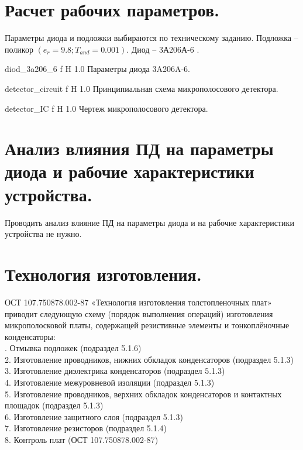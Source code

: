 \documentclass{bmstu}
\begin{document}
	\chapter{Расчет рабочих параметров.}
	
	\indent	Параметры диода и подложки выбираются по техническому заданию. Подложка – 
	поликор $(e_r = 9.8; T_{and} = 0.001)$. Диод – 3А206А-6 \cite{8}.
	
	{diod_3a206_6}
	{f} %
	{H} %
	{1.0\textwidth} %
	{Параметры диода 3A206A-6.} %
	
	{detector_circuit}
	{f} %
	{H} %
	{1.0\textwidth} %
	{Принципиальная схема микрополосового детектора.} %
	
	{detector_IC}
	{f} %
	{H} %
	{1.0\textwidth} %
	{Чертеж микрополосового детектора.} %
	
	\chapter{Анализ влияния ПД на параметры диода и рабочие характеристики устройства.}
	
	Проводить анализ влияние ПД на параметры диода и на рабочие характеристики устройства не нужно.
	
	\chapter{Технология изготовления.} 
	
	ОСТ 107.750878.002-87   «Технология изготовления толстопленочных плат» приводит следующую схему (порядок выполнения операций)  изготовления микрополосковой платы, содержащей резистивные элементы и тонкоплёночные конденсаторы:\\
	
	. Отмывка подложек (подраздел 5.1.6) \\
	2. Изготовление проводников, нижних обкладок конденсаторов (подраздел 5.1.3) \\
	3. Изготовление диэлектрика конденсаторов (подраздел 5.1.3) \\
	4. Изготовление межуровневой изоляции (подраздел 5.1.3) \\
	5. Изготовление проводников, верхних обкладок конденсаторов и контактных площадок (подраздел 5.1.3) \\
	6. Изготовление защитного слоя (подраздел 5.1.3) \\
	7. Изготовление резисторов (подраздел 5.1.4) \\
	8. Контроль плат (ОСТ 107.750878.002-87) \\
\end{document}

